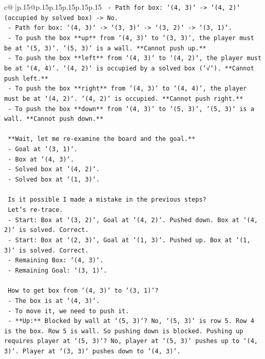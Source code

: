 \documentclass{article}
\begin{document}
{\begin{supertabular}{c@{$\;$}|p{.15\linewidth}@{}p{.15\linewidth}p{.15\linewidth}p{.15\linewidth}p{.15\linewidth}p{.15\linewidth}}
{{{\texttt{    {-} Path for box: `(4, 3)` {-}> `(4, 2)` (occupied by solved box) {-}> No.} \\
\texttt{    {-} Path for box: `(4, 3)` {-}> `(3, 3)` {-}> `(3, 2)` {-}> `(3, 1)`.} \\
\texttt{    {-} To push the box **up** from `(4, 3)` to `(3, 3)`, the player must be at `(5, 3)`. `(5, 3)` is a wall. **Cannot push up.**} \\
\texttt{    {-} To push the box **left** from `(4, 3)` to `(4, 2)`, the player must be at `(4, 4)`. `(4, 2)` is occupied by a solved box (`√`). **Cannot push left.**} \\
\texttt{    {-} To push the box **right** from `(4, 3)` to `(4, 4)`, the player must be at `(4, 2)`. `(4, 2)` is occupied. **Cannot push right.**} \\
\texttt{    {-} To push the box **down** from `(4, 3)` to `(5, 3)`, `(5, 3)` is a wall. **Cannot push down.**} \\
\\ 
\texttt{    **Wait, let me re{-}examine the board and the goal.**} \\
\texttt{    {-} Goal at `(3, 1)`.} \\
\texttt{    {-} Box at `(4, 3)`.} \\
\texttt{    {-} Solved box at `(4, 2)`.} \\
\texttt{    {-} Solved box at `(1, 3)`.} \\
\\ 
\texttt{    Is it possible I made a mistake in the previous steps?} \\
\texttt{    Let's re{-}trace.} \\
\texttt{    {-} Start: Box at `(3, 2)`, Goal at `(4, 2)`. Pushed down. Box at `(4, 2)` is solved. Correct.} \\
\texttt{    {-} Start: Box at `(2, 3)`, Goal at `(1, 3)`. Pushed up. Box at `(1, 3)` is solved. Correct.} \\
\texttt{    {-} Remaining Box: `(4, 3)`.} \\
\texttt{    {-} Remaining Goal: `(3, 1)`.} \\
\\ 
\texttt{    How to get box from `(4, 3)` to `(3, 1)`?} \\
\texttt{    {-} The box is at `(4, 3)`.} \\
\texttt{    {-} To move it, we need to push it.} \\
\texttt{    {-} **Up:** Blocked by wall at `(5, 3)`? No, `(5, 3)` is row 5. Row 4 is the box. Row 5 is wall. So pushing down is blocked. Pushing up requires player at `(5, 3)`? No, player at `(5, 3)` pushes up to `(4, 3)`. Player at `(3, 3)` pushes down to `(4, 3)`.} \\
}}}
\end{supertabular}}
\end{document}
